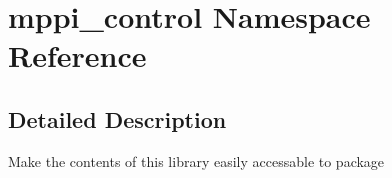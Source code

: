 \hypertarget{namespacemppi__control}{}\section{mppi\+\_\+control Namespace Reference}
\label{namespacemppi__control}


\subsection{Detailed Description}
\begin{DoxyVerb}Make the contents of this library easily accessable to package \end{DoxyVerb}
 